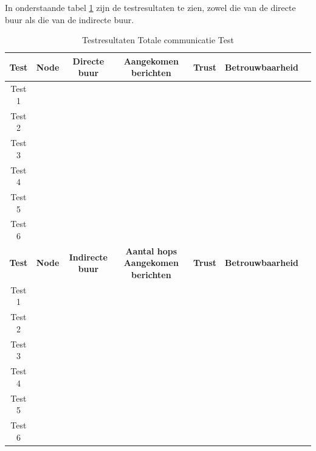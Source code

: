 In onderstaande tabel \ref{Test:TotCom} zijn de testresultaten te zien, zowel die van de directe buur als die van de indirecte buur.
\begin{table}[h]
    \centering
    \begin{tabular}{|c||c|c|c|c|c|c|}
        \hline
        \textbf{Test}    & \textbf{Node}  & \textbf{Directe buur}   & \textbf{Aangekomen berichten}  & \textbf{Trust}     & \textbf{Betrouwbaarheid}   &\\\hline\hline
        Test 1  &       &                &                       &           &                   &\\\hline
        Test 2  &       &                &                       &           &                   &\\\hline
        Test 3  &       &                &                       &           &                   &\\\hline
        Test 4  &       &                &                       &           &                   &\\\hline
        Test 5  &       &                &                       &           &                   &\\\hline
        Test 6  &       &                &                       &           &                   &\\\hline\hline
        \textbf{Test}    & \textbf{Node}  & \textbf{Indirecte buur}   & \textbf{Aantal hops} \textbf{Aangekomen berichten}  & \textbf{Trust}     & \textbf{Betrouwbaarheid}   \\\hline\hline
        Test 1  &       &                &           &            &           &                   \\\hline
        Test 2  &       &                &           &            &           &                   \\\hline
        Test 3  &       &                &           &            &           &                   \\\hline
        Test 4  &       &                &           &            &           &                   \\\hline
        Test 5  &       &                &           &            &           &                   \\\hline
        Test 6  &       &                &           &            &           &                   \\\hline\hline
    \end{tabular}
    \caption{Testresultaten Totale communicatie Test}
    \label{Test:TotCom}
\end{table}

